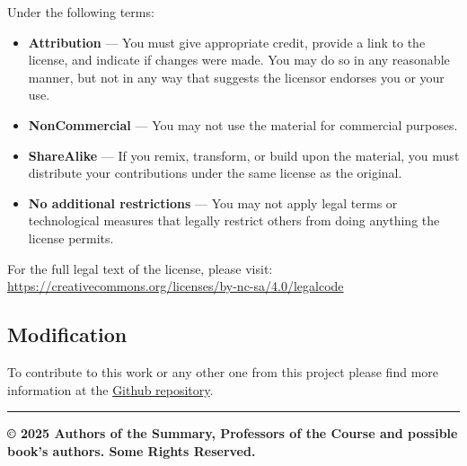 \documentclass[
  a4paper,
  ,captions=tableheading
]{scrartcl}
\providecommand{\tightlist}{%
  \setlength{\itemsep}{0pt}\setlength{\parskip}{0pt}}
\begin{document}
Under the following terms:

\begin{itemize}
\tightlist
\item
  \textbf{Attribution} --- You must give appropriate credit, provide a
  link to the license, and indicate if changes were made. You may do so
  in any reasonable manner, but not in any way that suggests the
  licensor endorses you or your use.
\item
  \textbf{NonCommercial} --- You may not use the material for commercial
  purposes.
\item
  \textbf{ShareAlike} --- If you remix, transform, or build upon the
  material, you must distribute your contributions under the same
  license as the original.
\item
  \textbf{No additional restrictions} --- You may not apply legal terms
  or technological measures that legally restrict others from doing
  anything the license permits.
\end{itemize}

For the full legal text of the license, please visit:
\url{https://creativecommons.org/licenses/by-nc-sa/4.0/legalcode}

\subsection{Modification}\label{modification}

To contribute to this work or any other one from this project please
find more information at the
\href{https://github.com/Tfloow/ESATSummary}{Github repository}.

\begin{center}\rule{0.5\linewidth}{0.5pt}\end{center}

\textbf{© 2025 Authors of the Summary, Professors of the Course and
possible book's authors. Some Rights Reserved.}
\end{document}
